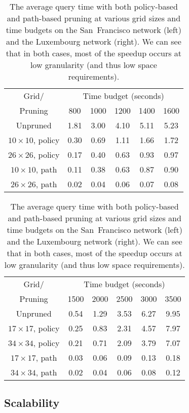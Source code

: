 \documentclass[oribibl]{llncs}
\begin{document}
			\begin{table}[H]
				\centering
				\caption
				{
					The average query time with both policy-based and path-based pruning
					at various grid sizes and time budgets on the San~Francisco network (left)
					and the Luxembourg network (right).
					We can see that in both cases, most of the speedup occurs at low granularity
					(and thus low space requirements).
				}
				\begin{tabular}{|c|c|c|c|c|c|} \noalign{\smallskip}\hline
					Grid/ & \multicolumn{5}{c|}{Time budget (seconds)}  \\\cline{2-6}
					Pruning & 800 & 1000 & 1200 & 1400 & 1600     \\
\hline
					Unpruned        & 1.81 & 3.00 & 4.10 & 5.11 & 5.23  \\ \hline
					$10\times 10$, policy & 0.30 & 0.69 & 1.11 & 1.66 & 1.72  \\ \hline
					$26\times 26$, policy & 0.17 & 0.40 & 0.63 & 0.93 & 0.97  \\ \hline
					$10\times 10$, path   & 0.11 & 0.38 & 0.63 & 0.87 & 0.90  \\ \hline
					$26\times 26$, path   & 0.02 & 0.04 & 0.06 & 0.07 & 0.08  \\ \hline
				\end{tabular}
				\begin{tabular}{|c|c|c|c|c|c|} \noalign{\smallskip}\hline
					Grid/ & \multicolumn{5}{c|}{Time budget (seconds)}  \\\cline{2-6}
					Pruning & 1500 & 2000 & 2500 & 3000 & 3500     \\
\hline
					Unpruned        & 0.54 & 1.29 & 3.53 & 6.27 & 9.95  \\ \hline
					$17\times 17$, policy & 0.25 & 0.83 & 2.31 & 4.57 & 7.97  \\ \hline
					$34\times 34$, policy & 0.21 & 0.71 & 2.09 & 3.79 & 7.07  \\ \hline
					$17\times 17$, path   & 0.03 & 0.06 & 0.09 & 0.13 & 0.18  \\ \hline
					$34\times 34$, path   & 0.02 & 0.04 & 0.06 & 0.08 & 0.12  \\ \hline
				\end{tabular}
				\label{ref:Policy_Against_Path-ZDC-Table}
			\end{table}

		\subsection{Scalability}\label{sec:scalability}
\end{document}
